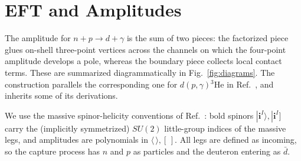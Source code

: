 \documentclass[
  aps,prd,twocolumn,nofootinbib,superscriptaddress,
  longbibliography,floatfix,preprintnumbers
]{revtex4-2}
\newcommand{\npdg}{n+p\to d+\gamma}
\newcommand{\dpHe}{d(p,\gamma){}^{3}\mathrm{He}}
\begin{document}
\section{EFT and Amplitudes}
\label{sec:framework}


The amplitude for $\npdg$ is the sum of two pieces: the factorized piece glues
on-shell three-point vertices across the channels on which the four-point
amplitude develops a pole, whereas the boundary piece collects local contact terms.
These are summarized diagrammatically in Fig.~\ref{fig:diagrams}.
The construction parallels the corresponding one for $\dpHe$ in
Ref.~\cite{Tait:2026guk}, and inherits some of its derivations.

We use the massive spinor-helicity conventions of
Ref.~\cite{Arkani-Hamed:2017jhn}: bold spinors
$|\bm{i}^{I}\rangle,|\bm{i}^{I}]$ carry the (implicitly symmetrized) $SU(2)$ little-group
indices of the massive legs, and amplitudes are polynomials in $\langle\,\rangle,[\,]$. All
legs are defined as incoming, so the capture process has $n$ and $p$ as particles and the deuteron
entering as $\bar d$.
\end{document}
